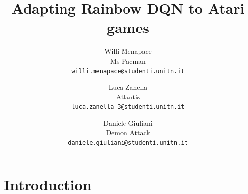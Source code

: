 \documentclass[10pt,twocolumn,letterpaper]{article}
\begin{document}
\title{Adapting Rainbow DQN to Atari games}

\author{Willi Menapace\\
Ms-Pacman\\
{\tt\small willi.menapace@studenti.unitn.it}
\and
Luca Zanella\\
Atlantis\\
{\tt\small luca.zanella-3@studenti.unitn.it}
\and
Daniele Giuliani\\
Demon Attack\\
{\tt\small daniele.giuliani@studenti.unitn.it}
}

\maketitle



\section{Introduction}
\end{document}

